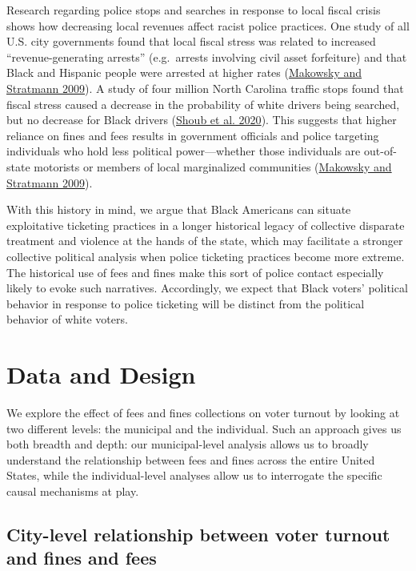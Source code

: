 \documentclass[
  12pt,
]{article}
\begin{document}
Research regarding police stops and searches in response to local fiscal crisis shows how decreasing local revenues affect racist police practices. One study of all U.S. city governments found that local fiscal stress was related to increased ``revenue-generating arrests'' (e.g.~arrests involving civil asset forfeiture) and that Black and Hispanic people were arrested at higher rates (\protect\hyperlink{ref-Makowsky2009}{Makowsky and Stratmann 2009}). A study of four million North Carolina traffic stops found that fiscal stress caused a decrease in the probability of white drivers being searched, but no decrease for Black drivers (\protect\hyperlink{ref-Shoub2020}{Shoub et al. 2020}). This suggests that higher reliance on fines and fees results in government officials and police targeting individuals who hold less political power---whether those individuals are out-of-state motorists or members of local marginalized communities (\protect\hyperlink{ref-Makowsky2009}{Makowsky and Stratmann 2009}).

With this history in mind, we argue that Black Americans can situate exploitative ticketing practices in a longer historical legacy of collective disparate treatment and violence at the hands of the state, which may facilitate a stronger collective political analysis when police ticketing practices become more extreme. The historical use of fees and fines make this sort of police contact especially likely to evoke such narratives. Accordingly, we expect that Black voters' political behavior in response to police ticketing will be distinct from the political behavior of white voters.

\hypertarget{data-and-design}{%
\section*{Data and Design}\label{data-and-design}}

We explore the effect of fees and fines collections on voter turnout by looking at two different levels: the municipal and the individual. Such an approach gives us both breadth and depth: our municipal-level analysis allows us to broadly understand the relationship between fees and fines across the entire United States, while the individual-level analyses allow us to interrogate the specific causal mechanisms at play.

\hypertarget{city-level-relationship-between-voter-turnout-and-fines-and-fees}{%
\subsection*{City-level relationship between voter turnout and fines and fees}\label{city-level-relationship-between-voter-turnout-and-fines-and-fees}}
\end{document}
